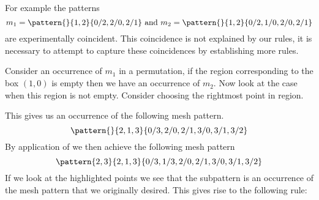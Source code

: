 For example the patterns
\begin{equation*}
    m_1 = \pattern{}{1,2}{0/2,2/0,2/1} \text{ and } m_2 = \pattern{}{1,2}{0/2,1/0,2/0,2/1}
\end{equation*}
are experimentally coincident. This coincidence is not explained by our rules,
it is necessary to attempt to capture these coincidences by establishing more
rules.

Consider an occurrence of \(m_1\) in a permutation, if the region corresponding
to the box \((1,0)\) is empty then we have an occurrence of \(m_2\). Now look at
the case when this region is not empty. Consider choosing the rightmost point in
region.

This gives us an occurrence of the following mesh pattern.
\begin{equation*}
    \pattern{}{2,1,3}{0/3,2/0,2/1,3/0,3/1,3/2}
\end{equation*}
By application of  we then achieve the following
mesh pattern
\begin{equation*}
    \pattern{2,3}{2,1,3}{0/3,1/3,2/0,2/1,3/0,3/1,3/2}
\end{equation*}
If we look at the highlighted points we see that the subpattern is an occurrence
of the mesh pattern that we originally desired. This gives rise to the following
rule:

